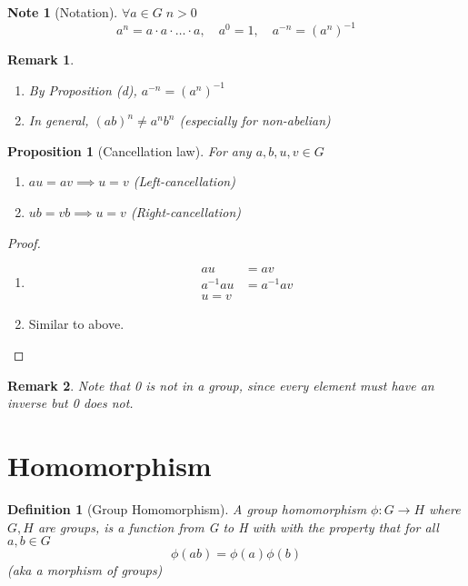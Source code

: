 \documentclass[11pt, oneside]{book}
\theoremstyle{break}
\newtheorem*{proof}{Proof}
\newtheorem{propo}{Proposition}[section]
\newtheorem*{remark}{Remark}
\newtheorem*{note}{Note}
\newtheorem{defn}{Definition}[section]
\begin{document}
\begin{note}[Notation]
    $\forall a \in G \; n > 0$
    \begin{equation*}
        a^n = a \cdot a \cdot \hdots \cdot a, \quad a^0 = 1, \quad a^{-n} = (a^n)^{-1}
    \end{equation*}
\end{note}

\begin{remark}
    \begin{enumerate}
        \item By Proposition (d), $a^{-n} = (a^n)^{-1}$
        \item In general, $(ab)^n \neq a^n b^n$ (especially for non-abelian)
    \end{enumerate}
\end{remark}

\begin{propo}[Cancellation law]
    For any $a, b, u, v \in G$
    \begin{enumerate}
        \item $au = av \implies u = v$ (Left-cancellation)
        \item $ub = vb \implies u = v$ (Right-cancellation)
    \end{enumerate}
\end{propo}

\begin{proof}
    \begin{enumerate}
        \item \begin{align*}
            au &= av \\
            a^{-1}au &= a^{-1}av \\
            u = v
        \end{align*}
        \item Similar to above.
    \end{enumerate}
\end{proof}

\begin{remark}
    Note that 0 is not in a group, since every element must have an inverse but 0 does not.
\end{remark}

\section{Homomorphism}

\begin{defn}[Group Homomorphism]
    A group homomorphism $\phi : G \to H$ where $G, H$ are groups, is a function from G to H with with the property that for all $a, b \in G$
    \begin{equation*}
        \phi(ab) = \phi(a)\phi(b)
    \end{equation*}
    (aka a morphism of groups)
\end{defn}
\end{document}
